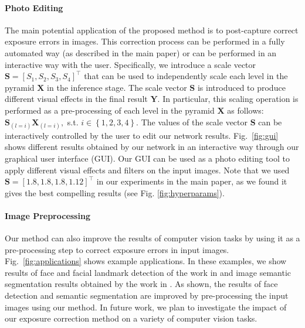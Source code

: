 \documentclass[final]{cvpr}
\begin{document}
\paragraph{Photo Editing}
The main potential application of the proposed method is to post-capture correct exposure errors in images. This correction process can be performed in a fully automated way (as described in the main paper) or can be performed in an interactive way with the user. Specifically, we introduce a scale vector $\mathbf{S} = \left[S_1, S_2, S_3, S_4\right]^\top$ that can be used to independently scale each level in the pyramid $\mathbf{X}$ in the inference stage. The scale vector $\mathbf{S}$ is introduced to produce different visual effects in the final result $\mathbf{Y}$. In particular, this scaling operation is performed as a pre-processing of each level in the pyramid $\mathbf{X}$ as follows: $\mathbf{S}_{(l=i)}\mathbf{X}_{(l=i)},$ s.t. $i \in \left\{1, 2, 3, 4\right\}$. 
The values of the scale vector $\mathbf{S}$ can be interactively controlled by the user to edit our network results. Fig.\ \ref{fig:gui} shows different results obtained by our network in an interactive way through our graphical user interface (GUI). Our GUI can be used as a photo editing tool to apply different visual effects and filters on the input images. Note that we used $\mathbf{S} = \left[1.8, 1.8, 1.8, 1.12\right]^\top$ in our experiments in the main paper, as we found it gives the best compelling results (see Fig. \ref{fig:hyperparams}). 

\paragraph{Image Preprocessing}
Our method can also improve the results of computer vision tasks by using it as a pre-processing step to correct exposure errors in input images. Fig.\ \ref{fig:applications} shows example applications. In these examples, we show results of face and facial landmark detection of the work in \cite{zhang2016joint} and image semantic segmentation results obtained by the work in \cite{Lin:2017:RefineNet, lin2019refinenet}. As shown, the results of face detection and semantic segmentation are improved by pre-processing the input images using our method. In future work, we plan to investigate the impact of our exposure correction method on a variety of computer vision tasks.
\end{document}
